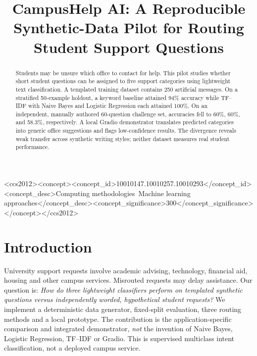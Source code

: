 \documentclass[sigconf,anonymous]{acmart}
\begin{document}
\title{CampusHelp AI: A Reproducible Synthetic-Data Pilot for Routing Student Support Questions}
\begin{abstract}
Students may be unsure which office to contact for help. This pilot studies whether short student questions can be assigned to five support categories using lightweight text classification. A templated training dataset contains 250 artificial messages. On a stratified 50-example holdout, a keyword baseline attained 94\% accuracy while TF--IDF with Naive Bayes and Logistic Regression each attained 100\%. On an independent, manually authored 60-question challenge set, accuracies fell to 60\%, 60\%, and 58.3\%, respectively. A local Gradio demonstrator translates predicted categories into generic office suggestions and flags low-confidence results. The divergence reveals weak transfer across synthetic writing styles; neither dataset measures real student performance.
\end{abstract}
\begin{CCSXML}
<ccs2012><concept><concept_id>10010147.10010257.10010293</concept_id><concept_desc>Computing methodologies~Machine learning approaches</concept_desc><concept_significance>300</concept_significance></concept></ccs2012>
\end{CCSXML}
\maketitle
\section{Introduction}
University support requests involve academic advising, technology, financial aid, housing and other campus services. Misrouted requests may delay assistance. Our question is: \emph{How do three lightweight classifiers perform on templated synthetic questions versus independently worded, hypothetical student requests?} We implement a deterministic data generator, fixed-split evaluation, three routing methods and a local prototype. The contribution is the application-specific comparison and integrated demonstrator, \emph{not} the invention of Naive Bayes, Logistic Regression, TF--IDF or Gradio. This is supervised multiclass intent classification, not a deployed campus service.
\end{document}
